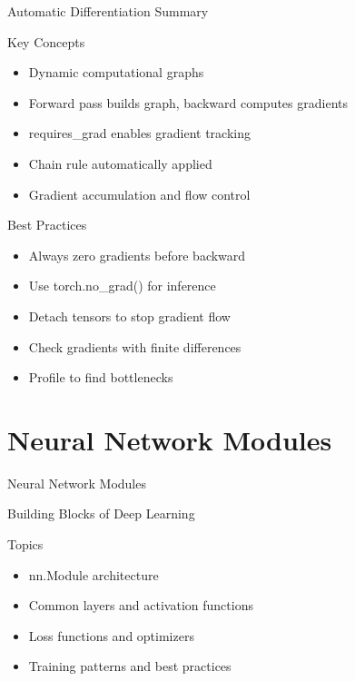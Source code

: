 \documentclass[aspectratio=169,10pt]{beamer}
\begin{document}
\begin{frame}{Automatic Differentiation Summary}
\begin{block}{Key Concepts}
\begin{itemize}
    \item Dynamic computational graphs
    \item Forward pass builds graph, backward computes gradients
    \item requires\_grad enables gradient tracking
    \item Chain rule automatically applied
    \item Gradient accumulation and flow control
\end{itemize}
\end{block}

\begin{alertblock}{Best Practices}
\begin{itemize}
    \item Always zero gradients before backward
    \item Use torch.no\_grad() for inference
    \item Detach tensors to stop gradient flow
    \item Check gradients with finite differences
    \item Profile to find bottlenecks
\end{itemize}
\end{alertblock}
\end{frame}

\section{Neural Network Modules}

\begin{frame}{Neural Network Modules}
\begin{center}
\Large{Building Blocks of Deep Learning}
\end{center}

\begin{block}{Topics}
\begin{itemize}
    \item nn.Module architecture
    \item Common layers and activation functions
    \item Loss functions and optimizers
    \item Training patterns and best practices
\end{itemize}
\end{block}
\end{frame}
\end{document}
